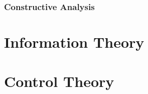 \documentclass{article}
\begin{document}
\section{Constructive Analysis}\label{sec:constructive_analysis}



\part{Information Theory}\label{sec:information_theory}



\part{Control Theory}\label{sec:control_theory}
\end{document}

